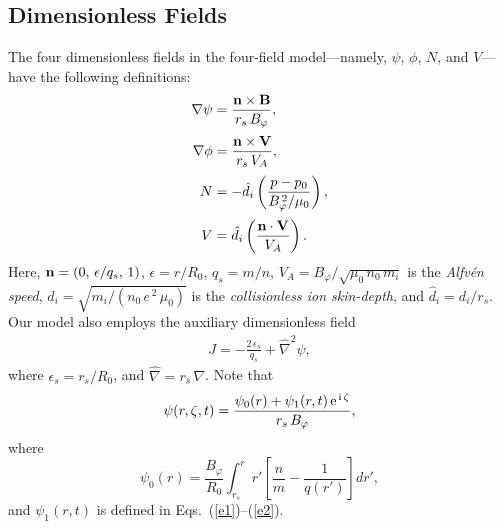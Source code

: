 \documentclass[12pt,prb,aps,notitlepage]{revtex4-1}
\begin{document}
\subsection{Dimensionless Fields}
The four  dimensionless fields in the four-field model---namely, $\psi$, $\phi$, $N$, and $V$---have the following
definitions:
\begin{align}\label{e10}
\nabla\psi &= \frac{{\bf n}\times{\bf B}} {r_s\,B_\varphi},\\[0.5ex]
\nabla\phi &= \frac{{\bf n}\times {\bf V}}{r_s\,V_A},\label{e40a}\\[0.5ex]
N &=-\hat{d}_i\left(\frac{p-p_0}{B_\varphi^{\,2}/\mu_0}\right),\\[0.5ex]
V &= \hat{d}_i\left(\frac{{\bf n}\cdot {\bf V}}{V_A}\right).\label{e13}
\end{align}
Here,   ${\bf n} = (0,\,\epsilon/q_s,\,1)$, $\epsilon = r/R_0$, $q_s=m/n$, 
$V_A =B_\varphi/\sqrt{\mu_0\,n_0\,m_i}$ is the {\em Alfv\'{e}n speed}, 
$d_i = \sqrt{m_i/(n_0\,e^{\,2}\,\mu_0)}$ is the {\em collisionless ion skin-depth},
and $\hat{d}_i=d_i/r_s$. 
 Our
model also employs the auxiliary dimensionless  field
\begin{align}\label{e16}
J=-\frac{2\,\epsilon_s}{q_s}+\hat{\nabla}^2\psi,
\end{align}
where 
$\epsilon_s=r_s/R_0$, and $\hat{\nabla} = r_s\,\nabla$. Note that 
\begin{equation}\label{e44}
\psi(r,\zeta,t) = \frac{\psi_0(r)+ \psi_1(r,t)\,{\rm e}^{\,{\rm i}\,\zeta}}{r_s\,B_\varphi},
\end{equation}
where
\begin{equation}\label{e45}
\psi_0(r) = \frac{B_\varphi}{R_0}\int_{r_s}^r r'\left[\frac{n}{m}-\frac{1}{q(r')}\right]dr',
\end{equation}
and $\psi_1(r,t)$ is defined in Eqs.~(\ref{e1})--(\ref{e2}). 
\end{document}
